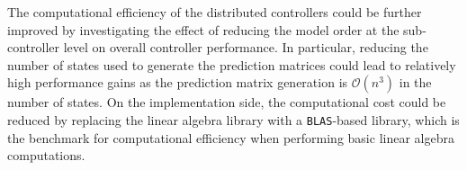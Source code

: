 The computational efficiency of the distributed controllers could be further improved by investigating the effect of reducing the model order at the sub-controller level on overall controller performance.
In particular, reducing the number of states used to generate the prediction matrices could lead to relatively high performance gains as the prediction matrix generation is $\mathcal{O}(n^3)$ in the number of states.
On the implementation side, the computational cost could be reduced by replacing the \eigen{} linear algebra library with a \texttt{BLAS}-based library, which is the benchmark for computational efficiency when performing basic linear algebra computations.

